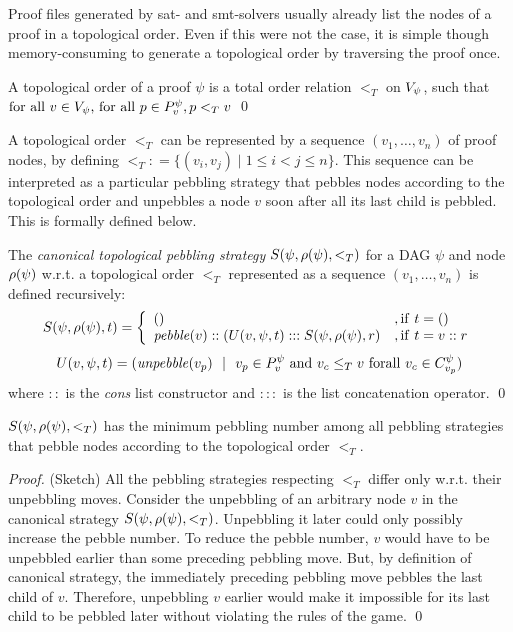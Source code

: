 \documentclass{llncs}
\newcommand{\defeq}{\mathrel{\mathop:}=}
\begin{document}
Proof files generated by sat- and smt-solvers usually already list the nodes of a proof in a topological order. Even if this were not the case, it is simple though memory-consuming to generate a topological order by traversing the proof once.

\begin{definition}
\label{def:topological-order}
A topological order of a proof $\psi$ is a total order relation $<_T$ on $V_{\psi}$, such that 
$
\text{for all } v \in V_{\psi} \text{, for all } p \in P_{v}^{\psi},
p <_T v
$
\qed
\end{definition}

\noindent
A topological order $<_T$ can be represented by a sequence $(v_1,\dots,v_n)$ of proof nodes, by defining $<_T \defeq \{(v_i,v_j) \mid 1 \leq i < j \leq n\}$. This sequence can be interpreted as a particular pebbling strategy that pebbles nodes according to the topological order and unpebbles a node $v$ soon after all its last child is pebbled. This is formally defined below.

\newcommand{\cstrategy}[3]{S(#1,#2,#3)}

\begin{definition}
The \emph{canonical topological pebbling strategy} $\cstrategy{\psi}{\raiz{\psi}}{<_T}$ for a DAG $\psi$ and node $\rho(\psi)$ w.r.t. a topological order $<_T$ represented as a sequence $(v_1,\dots,v_n)$ is defined recursively:
$$
\cstrategy{\psi}{\raiz{\psi}}{t} = \left\{\begin{array}{ll}  
                 () & , \mathrm{if } \ t = () \\
                 \mathit{pebble}(v)::(U(v, \psi, t):::\cstrategy{\psi}{\raiz{\psi}}{r} & , \mathrm{if } \ t = v::r 
               \end{array}\right.
$$
$$
U(v, \psi, t) = (\mathit{unpebble}(v_p) \ \  | \ \ v_p \in \Premises{v}{\psi} \ \mathrm{and} \ v_c \leq_T v \ \mathrm{for all} \ v_c \in \Children{v_p}{\psi})
$$
%
where $::$ is the \emph{cons} list constructor and $:::$ is the list concatenation operator.
\qed
\end{definition}

\begin{theorem}
\label{theorem:canonical}
$\cstrategy{\psi}{\raiz{\psi}}{<_T}$ has the minimum pebbling number among all pebbling strategies that pebble nodes according to the topological order $<_T$.
\end{theorem}
\begin{proof} (Sketch)
All the pebbling strategies respecting $<_T$ differ only w.r.t. their unpebbling moves.
Consider the unpebbling of an arbitrary node $v$ in the canonical strategy $\cstrategy{\psi}{\raiz{\psi}}{<_T}$. Unpebbling it later could only possibly increase the pebble number. To reduce the pebble number, $v$ would have to be unpebbled earlier than some preceding pebbling move. But, by definition of canonical strategy, the immediately preceding pebbling move pebbles the last child of $v$. Therefore, unpebbling $v$ earlier would make it impossible for its last child to be pebbled later without violating the rules of the game.
\qed
\end{proof}
\end{document}
